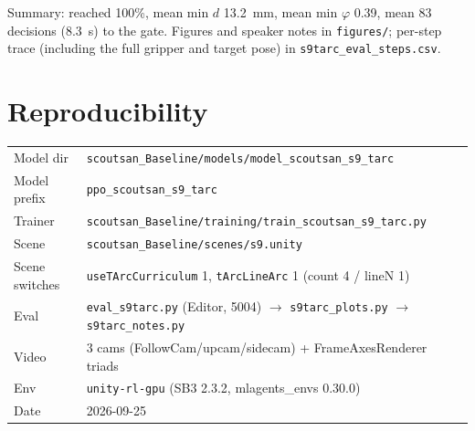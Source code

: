 \documentclass[11pt]{article}
\newcommand{\code}[1]{\texttt{#1}}
\begin{document}
Summary: reached 100\%, mean min $d$ 13.2~mm, mean min $\varphi$ 0.39\textdegree, mean 83 decisions (8.3~s) to the gate. Figures and speaker notes in \code{figures/}; per-step trace (including the full gripper and target pose) in \code{s9tarc\_eval\_steps.csv}.
\section*{Reproducibility}
\small\begin{tabular}{ll}
Model dir & \code{scoutsan\_Baseline/models/model\_scoutsan\_s9\_tarc}\\
Model prefix & \code{ppo\_scoutsan\_s9\_tarc}\\
Trainer & \code{scoutsan\_Baseline/training/train\_scoutsan\_s9\_tarc.py}\\
Scene & \code{scoutsan\_Baseline/scenes/s9.unity}\\
Scene switches & \code{useTArcCurriculum} 1, \code{tArcLineArc} 1 (count 4 / lineN 1)\\
Eval & \code{eval\_s9tarc.py} (Editor, 5004) $\to$ \code{s9tarc\_plots.py} $\to$ \code{s9tarc\_notes.py}\\
Video & 3 cams (FollowCam/upcam/sidecam) + FrameAxesRenderer triads\\
Env & \code{unity-rl-gpu} (SB3 2.3.2, mlagents\_envs 0.30.0)\\
Date & 2026-09-25\\
\end{tabular}\normalsize
\end{document}
